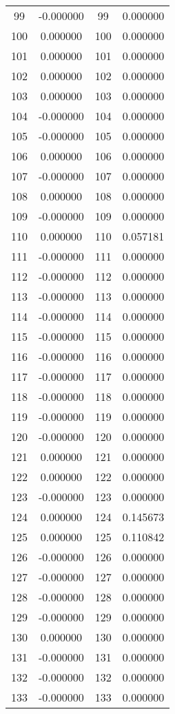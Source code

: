 \documentclass[12pt]{article}
\begin{document}
\begin{longtable}{@{}cccc@{}}
99 & -0.000000 & 99 & 0.000000 \\
100 & 0.000000 & 100 & 0.000000 \\
101 & 0.000000 & 101 & 0.000000 \\
102 & 0.000000 & 102 & 0.000000 \\
103 & 0.000000 & 103 & 0.000000 \\
104 & -0.000000 & 104 & 0.000000 \\
105 & -0.000000 & 105 & 0.000000 \\
106 & 0.000000 & 106 & 0.000000 \\
107 & -0.000000 & 107 & 0.000000 \\
108 & 0.000000 & 108 & 0.000000 \\
109 & -0.000000 & 109 & 0.000000 \\
110 & 0.000000 & 110 & 0.057181 \\
111 & -0.000000 & 111 & 0.000000 \\
112 & -0.000000 & 112 & 0.000000 \\
113 & -0.000000 & 113 & 0.000000 \\
114 & -0.000000 & 114 & 0.000000 \\
115 & -0.000000 & 115 & 0.000000 \\
116 & -0.000000 & 116 & 0.000000 \\
117 & -0.000000 & 117 & 0.000000 \\
118 & -0.000000 & 118 & 0.000000 \\
119 & -0.000000 & 119 & 0.000000 \\
120 & -0.000000 & 120 & 0.000000 \\
121 & 0.000000 & 121 & 0.000000 \\
122 & 0.000000 & 122 & 0.000000 \\
123 & -0.000000 & 123 & 0.000000 \\
124 & 0.000000 & 124 & 0.145673 \\
125 & 0.000000 & 125 & 0.110842 \\
126 & -0.000000 & 126 & 0.000000 \\
127 & -0.000000 & 127 & 0.000000 \\
128 & -0.000000 & 128 & 0.000000 \\
129 & -0.000000 & 129 & 0.000000 \\
130 & 0.000000 & 130 & 0.000000 \\
131 & -0.000000 & 131 & 0.000000 \\
132 & -0.000000 & 132 & 0.000000 \\
133 & -0.000000 & 133 & 0.000000 \\

\end{longtable}
\end{document}
